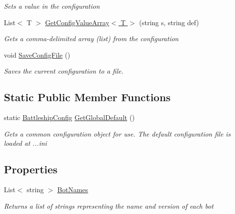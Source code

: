\begin{DoxyCompactItemize}
\begin{DoxyCompactList}\small\item\em Sets a value in the configuration\end{DoxyCompactList}\item 
List$<$ T $>$ \hyperlink{class_m_b_c_core_1_1_battleship_config_a9d51b410b158a3262967d7357e63695b}{Get\-Config\-Value\-Array$<$ T $>$} (string s, string def)
\begin{DoxyCompactList}\small\item\em Gets a comma-\/delimited array (list) from the configuration\end{DoxyCompactList}\item 
void \hyperlink{class_m_b_c_core_1_1_battleship_config_a934b448a0ef2489f527ab72fa0a692fd}{Save\-Config\-File} ()
\begin{DoxyCompactList}\small\item\em Saves the current configuration to a file.\end{DoxyCompactList}\end{DoxyCompactItemize}
\subsection*{Static Public Member Functions}
\begin{DoxyCompactItemize}
\item 
\hypertarget{class_m_b_c_core_1_1_battleship_config_a36de44005325ca88944f1a86ab15a13e}{static \hyperlink{class_m_b_c_core_1_1_battleship_config}{Battleship\-Config} \hyperlink{class_m_b_c_core_1_1_battleship_config_a36de44005325ca88944f1a86ab15a13e}{Get\-Global\-Default} ()}\label{class_m_b_c_core_1_1_battleship_config_a36de44005325ca88944f1a86ab15a13e}

\begin{DoxyCompactList}\small\item\em Gets a common configuration object for use. The default configuration file is loaded at ...ini\end{DoxyCompactList}\end{DoxyCompactItemize}
\subsection*{Properties}
\begin{DoxyCompactItemize}
\item 
\hypertarget{class_m_b_c_core_1_1_battleship_config_aadc40f94232b45e14de5d3371ef7a264}{List$<$ string $>$ \hyperlink{class_m_b_c_core_1_1_battleship_config_aadc40f94232b45e14de5d3371ef7a264}{Bot\-Names}}\label{class_m_b_c_core_1_1_battleship_config_aadc40f94232b45e14de5d3371ef7a264}

\begin{DoxyCompactList}\small\item\em Returns a list of strings representing the name and version of each bot\end{DoxyCompactList}\end{DoxyCompactItemize}



